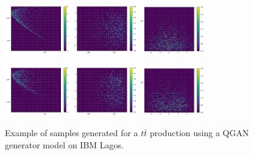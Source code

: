 \documentclass[twocolumn,preprintnumbers,superscriptaddress]{revtex4-2}
\begin{document}
\begin{figure}
  \includegraphics[width=0.25\textwidth]{plots/hardware_1k/ibm_lagos/s-t_REAL_1000_100.pdf}%
  \includegraphics[width=0.25\textwidth]{plots/hardware_1k/ibm_lagos/t-y_REAL_1000_100.pdf}%
  \includegraphics[width=0.25\textwidth]{plots/hardware_1k/ibm_lagos/y-s_REAL_1000_100.pdf}

  \includegraphics[width=0.25\textwidth]{plots/hardware_1k/ibm_lagos/s-t_FAKE_1000_100_3_5_2_10000_128_0.5_1024.pdf}%
  \includegraphics[width=0.25\textwidth]{plots/hardware_1k/ibm_lagos/t-y_FAKE_1000_100_3_5_2_10000_128_0.5_1024.pdf}%
  \includegraphics[width=0.25\textwidth]{plots/hardware_1k/ibm_lagos/y-s_FAKE_1000_100_3_5_2_10000_128_0.5_1024.pdf}

  \caption{\label{fig:3dgauss}Example of samples generated for a $t\bar{t}$
  production using a QGAN generator model on IBM Lagos.}
\end{figure}
\end{document}
